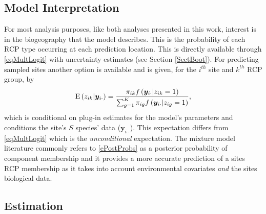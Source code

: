 \documentclass{statsoc}
\newcommand{\vy}{\bm{y}}
\newcommand{\ev}[1]{{\rm E}\left(#1\right)}
\begin{document}

\subsection{Model Interpretation}

For most analysis purposes, like both analyses presented in this work, interest is in the biogeography that the model describes. This is the probability of each RCP type occurring at each prediction location. This is directly available through \eqref{eqMultLogit} with uncertainty estimates (see Section \ref{SectBoot}). For predicting sampled sites another option is available and is given, for the $i^{th}$ site and $k^{th}$ RCP group, by
\begin{equation}
	\ev{z_{ik}|\vy_{i\cdot}}=\frac{\pi_{ik}f\left(\vy_{i\cdot}|z_{ik}=1\right)}{\sum_{g=1}^K\pi_{ig}f\left(\vy_{i\cdot}|z_{ig}=1\right)},\label{ePostProbs}
\end{equation}
which is conditional on plug-in estimates for the model's parameters and conditions the site's $S$ species' data ($\vy_{i\cdot}$). This expectation differs from \eqref{eqMultLogit} which is the \textit{unconditional} expectation. The mixture model literature commonly refers to \eqref{ePostProbs} as a posterior probability of component membership \citep[e.g.][]{mcl00} and it provides a more accurate prediction of a sites RCP membership as it takes into account environmental covariates \textit{and} the sites biological data.

\subsection{Estimation}\label{SectEsti}
\end{document}
